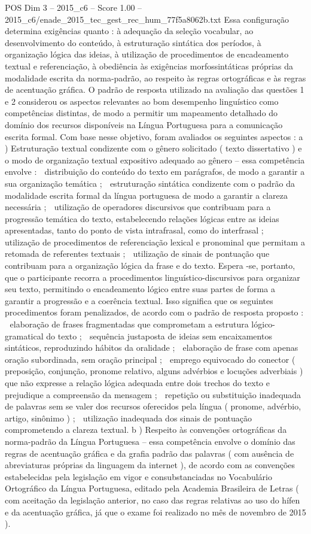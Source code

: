 \begin{textsample}{POS Dim 3 – 2015\_c6 – Score 1.00 – 2015\_c6/enade\_2015\_tec\_gest\_rec\_hum\_77f5a8062b.txt}
Essa configuração determina exigências quanto : à adequação da seleção vocabular, ao desenvolvimento do conteúdo, à estruturação sintática dos períodos, à organização lógica das ideias, à utilização de procedimentos de encadeamento textual e referenciação, à obediência às exigências morfossintáticas próprias da modalidade escrita da norma-padrão, ao respeito às regras ortográficas e às regras de acentuação gráfica.
O padrão de resposta utilizado na avaliação das questões 1 e 2 considerou os aspectos relevantes ao bom desempenho linguístico como competências distintas, de modo a permitir um mapeamento detalhado do domínio dos recursos disponíveis na Língua Portuguesa para a comunicação escrita formal.
Com base nesse objetivo, foram avaliados os seguintes aspectos : a ) Estruturação textual condizente com o gênero solicitado ( texto dissertativo ) e o modo de organização textual expositivo adequado ao gênero – essa competência envolve :  distribuição do conteúdo do texto em parágrafos, de modo a garantir a sua organização temática ;  estruturação sintática condizente com o padrão da modalidade escrita formal da língua portuguesa de modo a garantir a clareza necessária ;  utilização de operadores discursivos que contribuam para a progressão temática do texto, estabelecendo relações lógicas entre as ideias apresentadas, tanto do ponto de vista intrafrasal, como do interfrasal ;  utilização de procedimentos de referenciação lexical e pronominal que permitam a retomada de referentes textuais ;  utilização de sinais de pontuação que contribuam para a organização lógica da frase e do texto.
Espera -se, portanto, que o participante recorra a procedimentos linguístico-discursivos para organizar seu texto, permitindo o encadeamento lógico entre suas partes de forma a garantir a progressão e a coerência textual.
Isso significa que os seguintes procedimentos foram penalizados, de acordo com o padrão de resposta proposto :  elaboração de frases fragmentadas que comprometam a estrutura lógico-gramatical do texto ;  sequência justaposta de ideias sem encaixamentos sintáticos, reproduzindo hábitos da oralidade ;  elaboração de frase com apenas oração subordinada, sem oração principal ;  emprego equivocado do conector ( preposição, conjunção, pronome relativo, alguns advérbios e locuções adverbiais ) que não expresse a relação lógica adequada entre dois trechos do texto e prejudique a compreensão da mensagem ;  repetição ou substituição inadequada de palavras sem se valer dos recursos oferecidos pela língua ( pronome, advérbio, artigo, sinônimo ) ;  utilização inadequada dos sinais de pontuação comprometendo a clareza textual. b ) Respeito às convenções ortográficas da norma-padrão da Língua Portuguesa – essa competência envolve o domínio das regras de acentuação gráfica e da grafia padrão das palavras ( com ausência de abreviaturas próprias da linguagem da internet ), de acordo com as convenções estabelecidas pela legislação em vigor e consubstanciadas no Vocabulário Ortográfico da Língua Portuguesa, editado pela Academia Brasileira de Letras ( com aceitação da legislação anterior, no caso das regras relativas ao uso do hífen e da acentuação gráfica, já que o exame foi realizado no mês de novembro de 2015 ).

\end{textsample}
